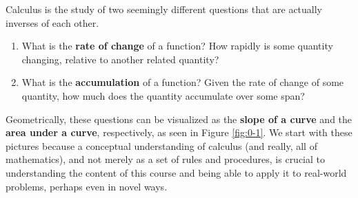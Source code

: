 Calculus is the study of two seemingly different questions that are actually inverses of each other.
\begin{enumerate}
    \item What is the {\bf rate of change} of a function?
    How rapidly is some quantity changing, relative to another related quantity?
    \item What is the {\bf accumulation} of a function?
    Given the rate of change of some quantity, how much does the quantity accumulate over some span?
\end{enumerate}
Geometrically, these questions can be visualized as the {\bf slope of a curve} and the {\bf area under a curve}, respectively, as seen in Figure \ref{fig:0-1}. We start with these pictures because a conceptual understanding of calculus (and really, all of mathematics), and not merely as a set of rules and procedures, is crucial to understanding the content of this course and being able to apply it to real-world problems, perhaps even in novel ways.

